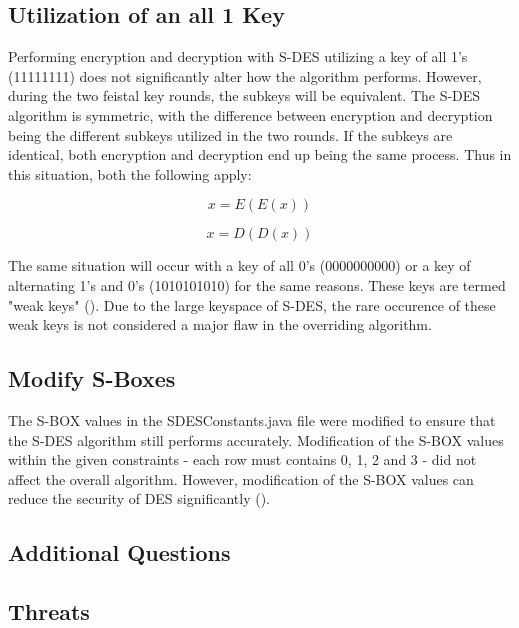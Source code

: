 \documentclass[]{article}
\begin{document}
\newpage
\subsection*{Utilization of an all 1 Key}

Performing encryption and decryption with S-DES utilizing a key of all 1's (11111111) does not significantly alter how the algorithm performs. However, during the two feistal key rounds, the subkeys will be equivalent. The S-DES algorithm is symmetric, with the difference between encryption and decryption being the different subkeys utilized in the two rounds. If the subkeys are identical, both encryption and decryption end up being the same process. Thus in this situation, both the following apply:

$$x=E( E(x) )$$

$$x=D( D(x) )$$

The same situation will occur with a key of all 0's (0000000000) or a key of alternating 1's and 0's (1010101010) for the same reasons. These keys are termed "weak keys" (\cite{alttext}). Due to the large keyspace of S-DES, the rare occurence of these weak keys is not considered a major flaw in the overriding algorithm.

\subsection*{Modify S-Boxes}


The S-BOX values in the SDESConstants.java file were modified to ensure that the S-DES algorithm still performs accurately. Modification of the S-BOX values within the given constraints - each row must contains 0, 1, 2 and 3 - did not affect the overall algorithm. However, modification of the S-BOX values can reduce the security of DES significantly (\cite{maintext}).

\break

\vspace*{-0.8cm}
\begin{center}
	\section*{Additional Questions}
\end{center}

\vspace*{0.8cm}
\subsection*{Threats}
\end{document}
